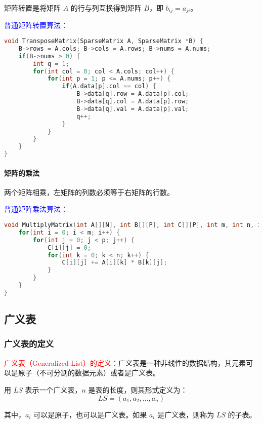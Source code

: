 \documentclass{../../note}
\begin{document}
矩阵转置是将矩阵 $A$ 的行与列互换得到矩阵 $B$，即 $b_{ij} = a_{ji}$。

\textcolor{blue}{普通矩阵转置算法}：
\begin{lstlisting}[language=C]
void TransposeMatrix(SparseMatrix A, SparseMatrix *B) {
    B->rows = A.cols; B->cols = A.rows; B->nums = A.nums;
    if(B->nums > 0) {
        int q = 1;
        for(int col = 0; col < A.cols; col++) {
            for(int p = 1; p <= A.nums; p++) {
                if(A.data[p].col == col) {
                    B->data[q].row = A.data[p].col;
                    B->data[q].col = A.data[p].row;
                    B->data[q].val = A.data[p].val;
                    q++;
                }
            }
        }
    }
}
\end{lstlisting}

\paragraph{矩阵的乘法}

两个矩阵相乘，左矩阵的列数必须等于右矩阵的行数。

\textcolor{blue}{普通矩阵乘法算法}：
\begin{lstlisting}[language=C]
void MultiplyMatrix(int A[][N], int B[][P], int C[][P], int m, int n, int p) {
    for(int i = 0; i < m; i++) {
        for(int j = 0; j < p; j++) {
            C[i][j] = 0;
            for(int k = 0; k < n; k++) {
                C[i][j] += A[i][k] * B[k][j];
            }
        }
    }
}
\end{lstlisting}

\subsection{广义表}

\subsubsection{广义表的定义}

\textcolor{red}{广义表（Generalized List）的定义}：广义表是一种非线性的数据结构，其元素可以是原子（不可分割的数据元素）或者是广义表。

用 $LS$ 表示一个广义表，$n$ 是表的长度，则其形式定义为：
\begin{equation}
  LS = (a_1, a_2, \ldots, a_n)
\end{equation}

其中，$a_i$ 可以是原子，也可以是广义表。如果 $a_i$ 是广义表，则称为 $LS$ 的子表。
\end{document}
